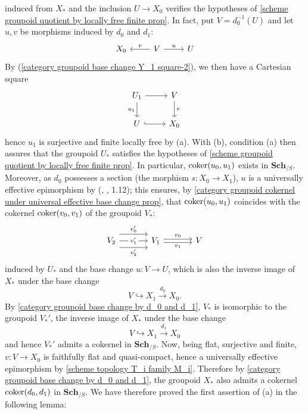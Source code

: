 induced from $X_*$ and the inclusion $U\to X_0$ verifies the hypotheses of \cref{scheme groupoid quotient by locally free finite prop}. In fact, put $V=d_0^{-1}(U)$ and let $u,v$ be morphisms induced by $d_0$ and $d_1$:
\[\begin{tikzcd}
X_0&V\ar[r,"u"]\ar[l,swap,"v"]&U
\end{tikzcd}\]
By (\ref{category groupoid base change Y_1 square-2}), we then have a Cartesian square
\[\begin{tikzcd}
U_1\ar[r]\ar[d,swap,"u_1"]&V\ar[d,"v"]\\
U\ar[r,hook]&X_0
\end{tikzcd}\]
hence $u_1$ is surjective and finite locally free by (a). With (b), condition (a) then assures that the groupoid $U_*$ satisfies the hypotheses of \cref{scheme groupoid quotient by locally free finite prop}. In particular, $\operatorname{coker}(u_0,u_1)$ exists in $\mathbf{Sch}_{/S}$. Moreover, as $d_0$ possesses a section (the morphism $s:X_0\to X_1$), $u$ is a universally effective epimorphism by (\cite{SGA3}, , 1.12); this ensures, by \cref{category groupoid cokernel under universal effective base change prop}, that $\operatorname{coker}(u_0,u_1)$ coincides with the cokernel $\operatorname{coker}(v_0,v_1)$ of the groupoid $V_*$:
\[\begin{tikzcd}[column sep=12mm]
V_2\ar[r,shift left=8pt,"v_0'"]\ar[r,shift right=8pt,swap,"v_2'"]\ar[r,"v_1'"description]&V_1\ar[r,shift left=2pt,"v_0"]\ar[r,shift right=2pt,swap,"v_1"]&V
\end{tikzcd}\]
induced by $U_*$ and the base change $u:V\to U$, which is also the inverse image of $X_*$ under the base change
\[V\hookrightarrow X_1\stackrel{d_0}{\to} X_0.\]
By \cref{category groupoid base change by d_0 and d_1}, $V_*$ is isomorphic to the groupoid $V_*'$, the inverse image of $X_*$ under the base change
\[V\hookrightarrow X_1\stackrel{d_1}{\to} X_0\]
and hence $V_*'$ admits a cokernel in $\mathbf{Sch}_{/S}$. Now, being flat, surjective and finite, $v:V\to X_0$ is faithfully flat and quasi-compact, hence a universally effective epimorphism by \cref{scheme topology T_i family M_i}. Therefore by \cref{category groupoid base change by d_0 and d_1}, the groupoid $X_*$ also admits a cokernel $\operatorname{coker}(d_0,d_1)$ in $\mathbf{Sch}_{/S}$. We have therefore proved the first assertion of (a) in the following lemma:

